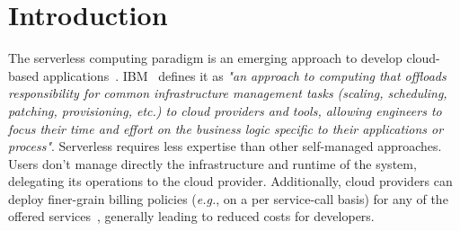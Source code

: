 \section{Introduction}
The serverless computing paradigm is an emerging approach to develop cloud-based applications~\cite{Baldini2017, riseofserverless, vanEyk:2017:SCG:3154847.3154848}.
\gls{IBM}~\cite{serverlessibm} defines it as \emph{"an approach to computing that offloads responsibility for common infrastructure management tasks (scaling, scheduling, patching, provisioning, etc.) to cloud providers and tools, allowing engineers to focus their time and effort on the business logic specific to their applications or process"}.
Serverless requires less expertise than other self-managed approaches.
Users don't manage directly the infrastructure and runtime of the system, delegating its operations to the cloud provider.
Additionally, cloud providers can deploy finer-grain billing policies (\emph{e.g.}, on a per service-call basis) for any of the offered services~\cite{serverlessaws, serverlessazure}, generally leading to reduced costs for developers.

